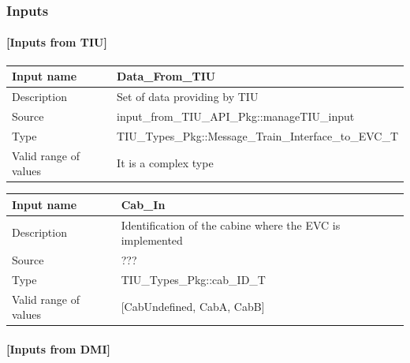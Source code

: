 \subsubsection{Inputs}\label{s:mode_and_level_inputs}

\paragraph{[Inputs from  TIU]}

\begin{longtable}{p{}p{}}
\toprule
Input name				& Data\_From\_TIU \\
\midrule
Description				& Set of data providing by TIU \\
\midrule
Source					& input\_from\_TIU\_API\_Pkg::manageTIU\_input \\ 
\midrule
Type					& TIU\_Types\_Pkg::Message\_Train\_Interface\_to\_EVC\_T \\
Valid range of values	& It is a complex type  \\
\bottomrule
\end{longtable}


\begin{longtable}{p{}p{}}
\toprule
Input name				& Cab\_In \\
\midrule
Description				& Identification of the cabine where the EVC is implemented \\
\midrule
Source					& ??? \\ 
\midrule
Type					& TIU\_Types\_Pkg::cab\_ID\_T \\
\midrule
Valid range of values	& [CabUndefined, CabA, CabB] \\
\bottomrule
\end{longtable}

\paragraph{[Inputs from DMI]}

